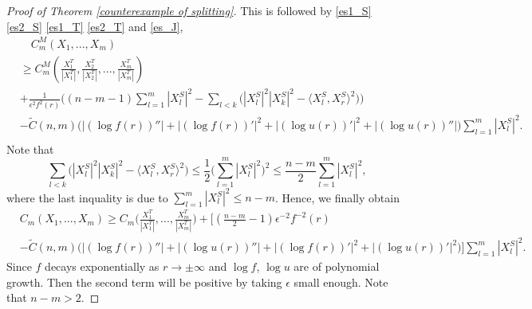 \documentclass[11pt,letterpaper]{amsart}
\theoremstyle{definition}
\theoremstyle{remark}
\numberwithin{equation}{section}
\begin{document}
\begin{proof}[Proof of Theorem \ref{counterexample of splitting}]
This is followed by \eqref{es1_S} \eqref{es2_S} \eqref{es1_T} \eqref{es2_T} and \eqref{es_J},
\[
\begin{aligned}
&\quad C^M_m(X_{1},...,X_{m})\\
&\geq C_{m}^{M}(\frac{X_{1}^{T}}{|X_{1}^{T}|},\frac{X_{2}^{T}}{|X_{2}^{T}|},...,\frac{X_{m}^{T}}{|X_{m}^{T}|})\\
&+ \frac{1}{\epsilon^2f^2(r)}\Big((n-m-1)\sum_{l=1}^{m}|X_{l}^{S}|^2-\sum_{l<k}\big(|X_{l}^{S}|^2|X_{k}^{S}|^2-\langle X_{l}^{S},X_{r}^{S}\rangle^2\big)\Big)\\
&-\tilde{C}(n,m)\Big(\big|(\log f(r))''\big|+\big|(\log f(r))'\big|^2+\big|(\log u(r))'\big|^2+\big|(\log u(r))''\big|\Big)\sum_{l=1}^{m}|X_{l}^{S}|^{2}.\\
\end{aligned}
\]
Note that
\[
\sum_{l<k}\big(|X_{l}^{S}|^2|X_{k}^{S}|^2-\langle X_{l}^{S},X_{r}^{S}\rangle^2\big)\leq \frac{1}{2}\big(\sum_{l=1}^{m}|X_{l}^{S}|^2\big)^2\leq \frac{n-m}{2}\sum_{l=1}^{m}|X_{l}^{S}|^2,
\]
where the last inquality is due to $\sum_{l=1}^{m}|X_{l}^{S}|^2\leq n-m$.
Hence, we finally obtain
\[
\begin{aligned}
&C_{m}(X_{1},...,X_{m})\geq C_{m}\Big(\frac{X_{1}^T}{|X_{1}^T|},...,\frac{X_{m}^T}{|X_{m}^T|}\Big)+\Big[(\frac{n-m}{2}-1)\epsilon^{-2}f^{-2}(r)\\
&-\tilde{C}(n,m)\Big(\big|(\log f(r))''\big|+\big|(\log u(r))''\big|+\big|(\log f(r))'\big|^2+\big|(\log u(r))'\big|^2\Big)\Big]\sum_{l=1}^{m}|X_{l}^{S}|^2.
\end{aligned}
\]
Since $f$ decays exponentially as $r\rightarrow \pm\infty$ and $\log f$, $\log u$ are of polynomial growth. Then the second term will be positive by taking $\epsilon$ small enough. Note that $n-m>2.$

\end{proof}
\end{document}
